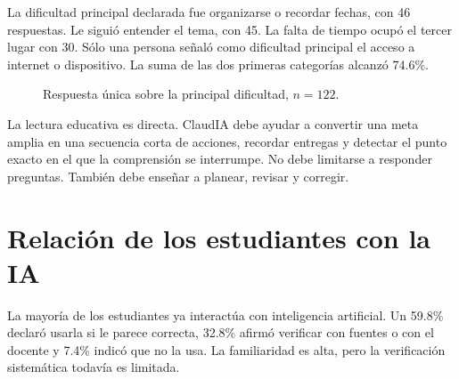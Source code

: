 \documentclass[letterpaper,11pt]{article}
\begin{document}
La dificultad principal declarada fue organizarse o recordar fechas, con 46 respuestas. Le siguió entender el tema, con 45. La falta de tiempo ocupó el tercer lugar con 30. Sólo una persona señaló como dificultad principal el acceso a internet o dispositivo. La suma de las dos primeras categorías alcanzó 74.6\%.

\begin{figure}[H]
\centering
{}
\caption{Respuesta única sobre la principal dificultad, $n=122$.}
\end{figure}

La lectura educativa es directa. ClaudIA debe ayudar a convertir una meta amplia en una secuencia corta de acciones, recordar entregas y detectar el punto exacto en el que la comprensión se interrumpe. No debe limitarse a responder preguntas. También debe enseñar a planear, revisar y corregir.

\clearpage

\section{Relación de los estudiantes con la IA}

La mayoría de los estudiantes ya interactúa con inteligencia artificial. Un 59.8\% declaró usarla si le parece correcta, 32.8\% afirmó verificar con fuentes o con el docente y 7.4\% indicó que no la usa. La familiaridad es alta, pero la verificación sistemática todavía es limitada.
\end{document}
